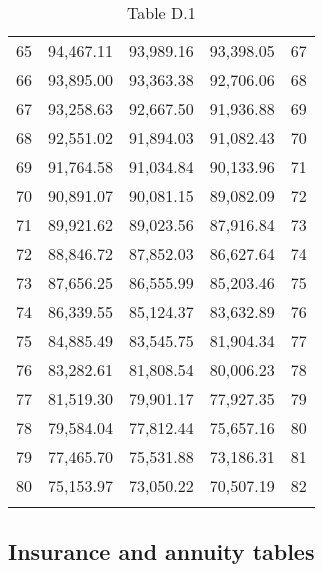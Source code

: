 \documentclass[12pt]{article}
\begin{document}
\begin{longtable}{rrrrr}
   65 & 94,467.11 & 93,989.16 & 93,398.05 &  67 \\ 
   66 & 93,895.00 & 93,363.38 & 92,706.06 &  68 \\ 
   67 & 93,258.63 & 92,667.50 & 91,936.88 &  69 \\ 
   68 & 92,551.02 & 91,894.03 & 91,082.43 &  70 \\ 
   69 & 91,764.58 & 91,034.84 & 90,133.96 &  71 \\ 
   70 & 90,891.07 & 90,081.15 & 89,082.09 &  72 \\ 
   71 & 89,921.62 & 89,023.56 & 87,916.84 &  73 \\ 
   72 & 88,846.72 & 87,852.03 & 86,627.64 &  74 \\ 
   73 & 87,656.25 & 86,555.99 & 85,203.46 &  75 \\ 
   74 & 86,339.55 & 85,124.37 & 83,632.89 &  76 \\ 
   75 & 84,885.49 & 83,545.75 & 81,904.34 &  77 \\ 
   76 & 83,282.61 & 81,808.54 & 80,006.23 &  78 \\ 
   77 & 81,519.30 & 79,901.17 & 77,927.35 &  79 \\ 
   78 & 79,584.04 & 77,812.44 & 75,657.16 &  80 \\ 
   79 & 77,465.70 & 75,531.88 & 73,186.31 &  81 \\ 
   80 & 75,153.97 & 73,050.22 & 70,507.19 &  82 \\ 
  \hline
\caption{Table D.1} 
\end{longtable}
\subsection{Insurance and annuity tables}
\end{document}
